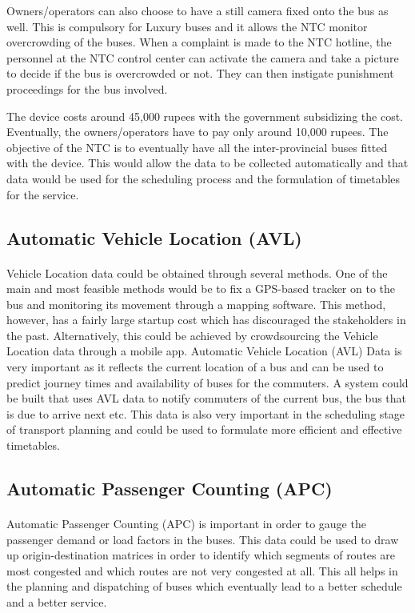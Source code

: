 \documentclass[12pt, oneside]{report}
\begin{document}
Owners/operators can also choose to have a still camera fixed onto the bus as well. This is compulsory for Luxury buses and it allows the NTC monitor overcrowding of the buses. When a complaint is made to the NTC hotline, the personnel at the NTC control center can activate the camera and take a picture to decide if the bus is overcrowded or not. They can then instigate punishment proceedings for the bus involved.

The device costs around 45,000 rupees with the government subsidizing the cost. Eventually, the owners/operators have to pay only around 10,000 rupees. The objective of the NTC is to eventually have all the inter-provincial buses fitted with the device. This would allow the data to be collected automatically and that data would be used for the scheduling process and the formulation of timetables for the service.

\subsection{Automatic Vehicle Location (AVL)}

\paragraph{ } Vehicle Location data could be obtained through several methods. One of the main and most feasible methods would be to fix a GPS-based tracker on to the bus and monitoring its movement through a mapping software. This method, however, has a fairly large startup cost which has discouraged the stakeholders in the past. Alternatively, this could be achieved by crowdsourcing the Vehicle Location data through a mobile app. Automatic Vehicle Location (AVL) Data is very important as it reflects the current location of a bus and can be used to predict journey times and availability of buses for the commuters. A system could be built that uses AVL data to notify commuters of the current bus, the bus that is due to arrive next etc. This data is also very important in the scheduling stage of transport planning and could be used to formulate more efficient and effective timetables.

\subsection{Automatic Passenger Counting (APC)}

\paragraph{ } Automatic Passenger Counting (APC) is important in order to gauge the passenger demand or load factors in the buses. This data could be used to draw up origin-destination matrices in order to identify which segments of routes are most congested and which routes are not very congested at all. This all helps in the planning and dispatching of buses which eventually lead to a better schedule and a better service.
\end{document}
